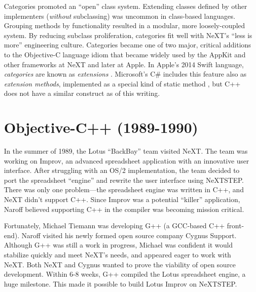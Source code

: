 \documentclass[acmsmall]{acmart}\settopmatter{}
\begin{document}
Categories promoted an ``open'' class system. Extending classes defined by other implementers (\emph{without} subclassing) was uncommon in class-based languages. Grouping methods by functionality resulted in a modular, more loosely-coupled system. By reducing subclass proliferation, categories fit well with NeXT's ``less is more'' engineering culture. Categories became one of two major, critical additions to the Objective-C language idiom that became widely used by the AppKit and other frameworks at NeXT and later at Apple. In Apple's 2014 Swift language, \emph{categories} are known as \emph{extensions} \citep{apple_inc_extensions_2020}. Microsoft's C\# includes this feature also as \emph{extension methods}, implemented as a special kind of static method \citep{microsoft_extension_2015}, but C++ does not have a similar construct as of this writing.

\section{Objective-C++ (1989-1990)}
\label{sec-ObjC++1989-1990}
In the summer of 1989, the Lotus ``BackBay'' team visited NeXT. The team was working on Improv, an advanced spreadsheet application with an innovative user interface. After struggling with an OS/2 implementation, the team decided to port the spreadsheet ``engine'' and rewrite the user interface using NeXTSTEP. There was only one problem---the spreadsheet engine was written in C++, and NeXT didn't support C++. Since Improv was a potential ``killer'' application, Naroff believed supporting C++ in the compiler was becoming mission critical.

Fortunately, Michael Tiemann was developing G++ (a GCC-based C++ front-end). Naroff visited his newly formed open source company Cygnus Support. Although G++ was still a work in progress, Michael was confident it would stabilize quickly and meet NeXT's needs, and appeared eager to work with NeXT. Both NeXT and Cygnus wanted to prove the viability of open source development. Within 6-8 weeks, G++ compiled the Lotus spreadsheet engine, a huge milestone. This made it possible to build Lotus Improv on NeXTSTEP.
\end{document}
